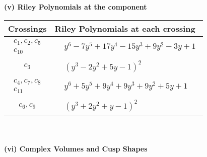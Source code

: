 \documentclass[1p]{elsarticle_modified}
\theoremstyle{definition}
\begin{document}
\newpage\renewcommand{\arraystretch}{1}
\flushleft \textbf{(v) Riley Polynomials at the component}\newline \\
\begin{tabular}{m{50pt}|m{274pt}}
Crossings & \hspace{64pt}Riley Polynomials at each crossing \\
\hline $$\begin{aligned}c_{1},c_{2},c_{5}\\c_{10}\end{aligned}$$&$\begin{aligned}
&y^6-7 y^5+17 y^4-15 y^3+9 y^2-3 y+1
\end{aligned}$\\
\hline $$\begin{aligned}c_{3}\end{aligned}$$&$\begin{aligned}
&(y^3-2 y^2+5 y-1)^2
\end{aligned}$\\
\hline $$\begin{aligned}c_{4},c_{7},c_{8}\\c_{11}\end{aligned}$$&$\begin{aligned}
&y^6+5 y^5+9 y^4+9 y^3+9 y^2+5 y+1
\end{aligned}$\\
\hline $$\begin{aligned}c_{6},c_{9}\end{aligned}$$&$\begin{aligned}
&(y^3+2 y^2+y-1)^2
\end{aligned}$\\
\hline
\end{tabular}\\~\\
\newpage\flushleft \textbf{(vi) Complex Volumes and Cusp Shapes}
\end{document}
